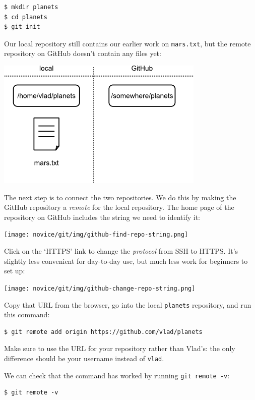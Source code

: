 \documentclass[]{book}
\newcommand{\gdef}[2]{\emph{#2}}
\begin{document}
\begin{verbatim}
$ mkdir planets
$ cd planets
$ git init
\end{verbatim}

Our local repository still contains our earlier work on
\texttt{mars.txt}, but the remote repository on GitHub doesn't contain
any files yet:

\includegraphics{novice/git/img/git-freshly-made-github-repo.png}

The next step is to connect the two repositories. We do this by making
the GitHub repository a \gdef{g:repository-remote}{remote} for the
local repository. The home page of the repository on GitHub includes the
string we need to identify it:

\texttt{[image: novice/git/img/github-find-repo-string.png]}

Click on the `HTTPS' link to change the \gdef{g:protocol}{protocol}
from SSH to HTTPS. It's slightly less convenient for day-to-day use, but
much less work for beginners to set up:

\texttt{[image: novice/git/img/github-change-repo-string.png]}

Copy that URL from the browser, go into the local \texttt{planets}
repository, and run this command:

\begin{verbatim}
$ git remote add origin https://github.com/vlad/planets
\end{verbatim}

Make sure to use the URL for your repository rather than Vlad's: the
only difference should be your username instead of \texttt{vlad}.

We can check that the command has worked by running
\texttt{git remote -v}:

\begin{verbatim}
$ git remote -v
\end{verbatim}
\end{document}
